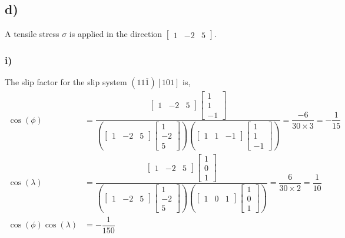 \documentclass[a4paper]{article}
\begin{document}
	\subsection{d)}
	A tensile stress $\sigma$ is applied in the direction $\begin{bmatrix} 1 & -2 & 5\end{bmatrix}$.
	\subsubsection{i)}
	The slip factor for the slip system $(1 1 \overline{1})[1 0 1]$ is,
	\begin{subequations}
		\begin{align}
			\cos(\phi) &= \dfrac{\begin{bmatrix} 1 & -2 & 5 \end{bmatrix} \begin{bmatrix} 1 \\ 1 \\ -1 \end{bmatrix}}{
				\left(\begin{bmatrix}	1 & -2 & 5 \end{bmatrix} \begin{bmatrix} 1 \\ -2 \\ 5 \end{bmatrix}\right)
				\left(\begin{bmatrix}	1 & 1 & -1 \end{bmatrix} \begin{bmatrix} 1 \\ 1 \\ -1 \end{bmatrix}\right)
				} = \dfrac{-6}{30 \times 3} = -\dfrac{1}{15}\\
				\cos(\lambda) &= \dfrac{\begin{bmatrix} 1 & -2 & 5 \end{bmatrix} \begin{bmatrix} 1 \\ 0 \\ 1 \end{bmatrix}}{
					\left(\begin{bmatrix}	1 & -2 & 5 \end{bmatrix} \begin{bmatrix} 1 \\ -2 \\ 5 \end{bmatrix}\right)
					\left(\begin{bmatrix}	1 & 0 & 1 \end{bmatrix} \begin{bmatrix} 1 \\ 0 \\ 1 \end{bmatrix}\right)
				} = \dfrac{6}{30 \times 2} = \dfrac{1}{10}\\
			\cos(\phi) \cos(\lambda) &= -\dfrac{1}{150}
		\end{align}
	\end{subequations}
\end{document}
